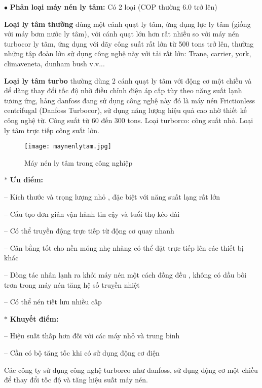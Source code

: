\begin{enumerate}
		$ \bullet $ \textbf{Phân loại máy nén ly tâm:} Có 2 loại (COP thường 6.0 trở lên)
		
		\textbf{Loại ly tâm thường} dùng một cánh quạt ly tâm, ứng dụng lực ly tâm (giống với máy bơm nước ly tâm), với cánh quạt lớn hơn rất nhiều so với máy nén turbocor ly tâm, ứng dụng với dãy công suất rất lớn từ 500 tons trở lên, thường những tập đoàn lớn sử dụng công nghệ này với tải rất lớn: Trane, carrier, york, climaveneta, dunham bush v.v...
		
		\textbf{Loại ly tâm turbo} thường dùng 2 cánh quạt ly tâm với động cơ một chiều và dể dàng thay đổi tốc độ nhờ điều chỉnh điện áp cấp tùy theo năng suất lạnh tương ứng, hảng danfoss đang sử dụng công nghệ này đó là máy nén Frictionless centrifugal (Danfoss Turbocor), sử dụng năng lượng hiệu quả cao nhờ thiết kế công nghệ từ. Công suất từ 60 đến 300 tons. Loại turborco: công suất nhỏ. Loại ly tâm trực tiếp công suất lớn.

\begin{figure}[H]
	\centering
	\texttt{[image: maynenlytam.jpg]}
	\caption{Máy nén ly tâm trong công nghiệp}
\end{figure}			
		
		$ \ast $ \textbf{Ưu điểm:} 
		
		– Kích thước và trọng lượng nhỏ , đặc biệt với năng suất lạng rất lớn
		
		– Cấu tạo đơn giản vận hành tin cậy và tuổi thọ kéo dài
		
		– Có thể truyền động trực tiếp từ động cơ quay nhanh
		
		– Cân bằng tốt cho nền móng nhẹ nhàng có thể đặt trực tiếp lên các thiết bị khác
		
		– Dòng tác nhân lạnh ra khỏi máy nén một cách đồng đều , không có dầu bôi trơn trong máy nén tăng hệ số truỵền nhiệt
		
		– Có thể nén tiết lưu nhiều cấp 
		
		$ \ast $ \textbf{Khuyết điểm:} 
		
		– Hiệu suất thấp hơn đối với các máy nhỏ và trung bình
		
		– Cần có bộ tăng tốc khi có sử dụng động cơ điện
		
		Các công ty sử dụng công nghệ turborco như danfoss, sử dụng động cơ một chiều để thay đổi tốc độ và tăng hiệu suất máy nén.
		
	\end{enumerate}
	
